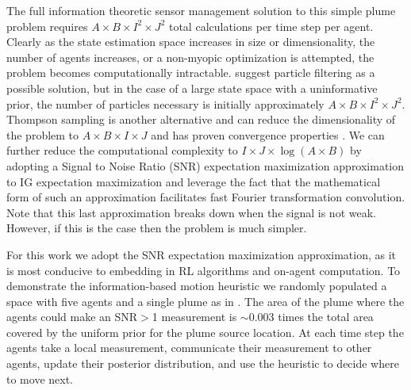 \documentclass[letterpaper]{article} %
\begin{document}
The full information theoretic sensor management solution to this simple plume problem requires $A \times B \times I^{2} \times J^{2}$ total calculations per time step per agent.
Clearly as the state estimation space increases in size or dimensionality, the number of agents increases, or a non-myopic optimization is attempted, the problem becomes computationally intractable.
\citet{kreucher2008particle} suggest particle filtering as a possible solution, but in the case of a large state space with a uninformative prior, the number of particles necessary is initially approximately $A \times B \times I^{2} \times J^{2}$.
Thompson sampling is another alternative and can reduce the dimensionality of the problem to $A \times B \times I \times J$ and has proven convergence properties \cite{verstraeten2020thompson}.
We can further reduce the computational complexity to $I \times J \times \log(A \times B)$ by adopting a Signal to Noise Ratio (SNR) expectation maximization approximation \cite{fisher1935design} to IG expectation maximization and leverage the fact that the mathematical form of such an approximation facilitates fast Fourier transformation convolution.
Note that this last approximation breaks down when the signal is not weak. However, if this is the case then the problem is much simpler.

For this work we adopt the SNR expectation maximization approximation, as it is most conducive to embedding in RL algorithms and on-agent computation.
To demonstrate the information-based motion heuristic we randomly populated a space with five agents and a single plume as in \citet{schmidt2019sequential}.
The area of the plume where the agents could make an SNR$>$1 measurement is $\sim$0.003 times the total area covered by the uniform prior for the plume source location.
At each time step the agents take a local measurement, communicate their measurement to other agents, update their posterior distribution, and use the heuristic to decide where to move next.
\end{document}
